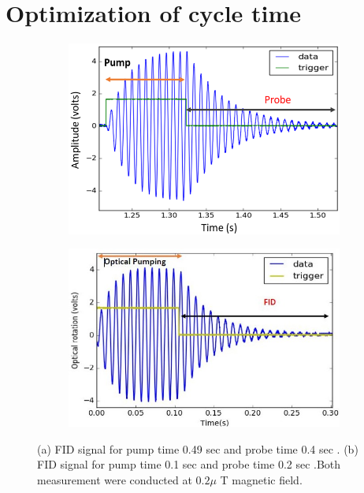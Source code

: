    \section{Optimization of cycle time} 
   \begin{figure}
    \centering
 
    \begin{subfigure}[b]{0.425\textwidth}
        \centering
        \includegraphics[width=\textwidth]{figures/Capture}
        \caption{}
        \label{fig:three sin x}
    \end{subfigure}
    \hfill
    \begin{subfigure}[b]{0.42\textwidth}
        \centering
        \includegraphics[width=\textwidth]{figures/Capture2}
        \caption{}
        \label{fig:five over x}
    \end{subfigure}
    \caption{(a) FID signal for pump time 0.49 sec and probe time 0.4 sec . (b) FID signal for pump time 0.1 sec and probe time 0.2 sec .Both measurement were conducted at $0.2 \mu$ T magnetic field.}
    \label{fig:three graphs}
\end{figure} 
